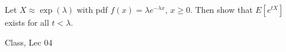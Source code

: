 \begin{samepage}
\begin{ex}
Let $X \approx \exp(\lambda)$ with pdf $f(x) = \lambda e^{- \lambda x}$, $x \geq 0$. Then show that $E[e^{tX}]$ exists for all $t < \lambda$.
\end{ex}
\begin{source}
Class, Lec 04
\end{source}
\end{samepage}
